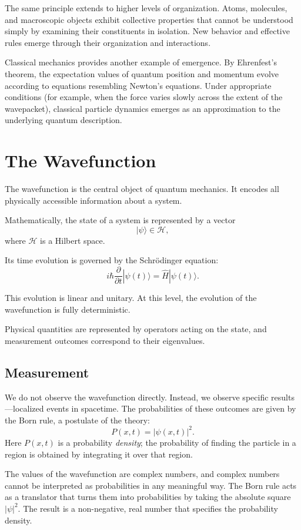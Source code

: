 The same principle extends to higher levels of organization. Atoms, molecules, and macroscopic objects exhibit collective properties that
cannot be understood simply by examining their constituents in isolation. New behavior and effective rules emerge through their
organization and interactions.

Classical mechanics provides another example of emergence. By Ehrenfest's theorem, the expectation values of quantum position and momentum evolve according to 
equations resembling Newton's equations. Under appropriate conditions (for example, when the force varies slowly across the extent of the wavepacket), classical particle dynamics emerges as
an approximation to the underlying quantum description.


\section*{The Wavefunction}

The wavefunction is the central object of quantum mechanics. It encodes all physically accessible information about a system.

Mathematically, the state of a system is represented by a vector
\[
|\psi\rangle \in \mathcal{H},
\]
where $\mathcal{H}$ is a Hilbert space.

Its time evolution is governed by the Schrödinger equation:
\[
i\hbar \frac{\partial}{\partial t} |\psi(t)\rangle = \hat{H} |\psi(t)\rangle.
\]

This evolution is linear and unitary. At this level, the evolution of the wavefunction is fully deterministic.

Physical quantities are represented by operators acting on the state, and measurement outcomes correspond to their eigenvalues.

\subsection*{Measurement}

We do not observe the wavefunction directly. Instead, we observe specific results---localized events in spacetime.
The probabilities of these outcomes are given by the Born rule, a postulate of the theory:
\[
P(x,t) = |\psi(x,t)|^2 .
\]
Here $P(x,t)$ is a probability \emph{density}; the probability of finding the particle in a region is obtained by integrating it over that region.

The values of the wavefunction are complex numbers, and complex numbers cannot be interpreted as probabilities in any meaningful way.
The Born rule acts as a translator that turns them into probabilities by taking the absolute square \( |\psi|^2 \).
The result is a non-negative, real number that specifies the probability density. 

